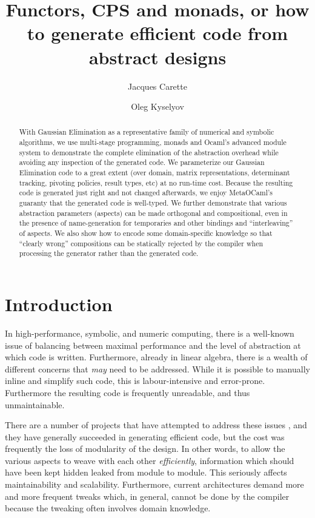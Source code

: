 \documentclass{llncs}
\begin{document}
\title{Functors, CPS and monads, or how to generate efficient
code from abstract designs}
\author{Jacques Carette
 \and
Oleg Kyselyov
}

\maketitle

\begin{abstract}
With Gaussian Elimination as a representative family of numerical
and symbolic
algorithms, we use multi-stage programming, monads and Ocaml's
advanced module system to demonstrate the complete elimination of the
abstraction overhead while avoiding any inspection of the generated
code.  We parameterize our Gaussian Elimination code to a great extent
(over domain, matrix representations, determinant tracking, 
pivoting policies, result types, etc) at no run-time cost.  Because
the resulting code is generated just right and not changed afterwards,
we enjoy MetaOCaml's guaranty that the generated code is well-typed.
We further demonstrate that various abstraction parameters (aspects)
can be made orthogonal and compositional, even in the presence of
name-generation for temporaries and other bindings and
``interleaving'' of aspects.  We also show how to encode some
domain-specific knowledge so that ``clearly wrong'' compositions can
be statically rejected by the compiler when processing the generator
rather than the generated code.
\end{abstract}

\section{Introduction}

In high-performance, symbolic, and numeric computing, there is a well-known
issue of balancing between maximal performance and the level of
abstraction at which code is written.  Furthermore, already in
linear algebra, there is a wealth of different concerns that 
\emph{may} need to be addressed.  While it is possible to manually
inline and simplify such code, this is labour-intensive and 
error-prone.  Furthermore the resulting code is frequently unreadable,
and thus unmaintainable.

There are a number of projects that have attempted to address these issues
\cite{Czarnecki,Veldhuizen:1998:ISCOPE,musser94algorithmoriented,BOOST,POOMA,ATLAS}, 
and they have generally succeeded in generating
efficient code, but the cost was frequently the loss of modularity
of the design.  In other words, to allow the various aspects to
weave with each other \emph{efficiently}, information which should
have been kept hidden leaked from module to module.  This seriously
affects maintainability and scalability.  Furthermore, current architectures
demand more and more frequent tweaks which, in general, cannot be done by the
compiler because the tweaking often involves domain knowledge.  
\end{document}
